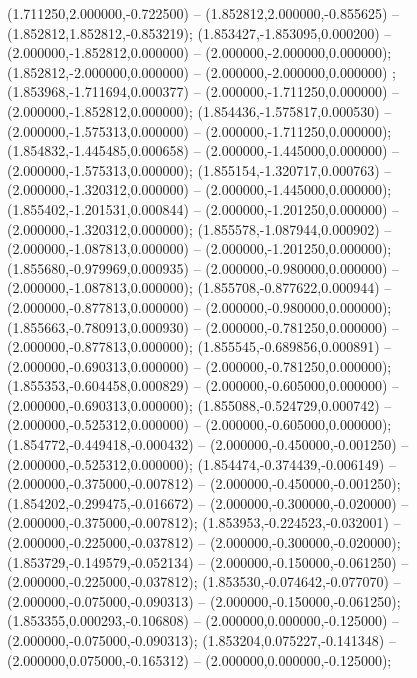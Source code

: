  (1.711250,2.000000,-0.722500) -- (1.852812,2.000000,-0.855625) -- (1.852812,1.852812,-0.853219);
 (1.853427,-1.853095,0.000200) -- (2.000000,-1.852812,0.000000) -- (2.000000,-2.000000,0.000000);
 (1.852812,-2.000000,0.000000) -- (2.000000,-2.000000,0.000000) ;
 (1.853968,-1.711694,0.000377) -- (2.000000,-1.711250,0.000000) -- (2.000000,-1.852812,0.000000);
 (1.854436,-1.575817,0.000530) -- (2.000000,-1.575313,0.000000) -- (2.000000,-1.711250,0.000000);
 (1.854832,-1.445485,0.000658) -- (2.000000,-1.445000,0.000000) -- (2.000000,-1.575313,0.000000);
 (1.855154,-1.320717,0.000763) -- (2.000000,-1.320312,0.000000) -- (2.000000,-1.445000,0.000000);
 (1.855402,-1.201531,0.000844) -- (2.000000,-1.201250,0.000000) -- (2.000000,-1.320312,0.000000);
 (1.855578,-1.087944,0.000902) -- (2.000000,-1.087813,0.000000) -- (2.000000,-1.201250,0.000000);
 (1.855680,-0.979969,0.000935) -- (2.000000,-0.980000,0.000000) -- (2.000000,-1.087813,0.000000);
 (1.855708,-0.877622,0.000944) -- (2.000000,-0.877813,0.000000) -- (2.000000,-0.980000,0.000000);
 (1.855663,-0.780913,0.000930) -- (2.000000,-0.781250,0.000000) -- (2.000000,-0.877813,0.000000);
 (1.855545,-0.689856,0.000891) -- (2.000000,-0.690313,0.000000) -- (2.000000,-0.781250,0.000000);
 (1.855353,-0.604458,0.000829) -- (2.000000,-0.605000,0.000000) -- (2.000000,-0.690313,0.000000);
 (1.855088,-0.524729,0.000742) -- (2.000000,-0.525312,0.000000) -- (2.000000,-0.605000,0.000000);
 (1.854772,-0.449418,-0.000432) -- (2.000000,-0.450000,-0.001250) -- (2.000000,-0.525312,0.000000);
 (1.854474,-0.374439,-0.006149) -- (2.000000,-0.375000,-0.007812) -- (2.000000,-0.450000,-0.001250);
 (1.854202,-0.299475,-0.016672) -- (2.000000,-0.300000,-0.020000) -- (2.000000,-0.375000,-0.007812);
 (1.853953,-0.224523,-0.032001) -- (2.000000,-0.225000,-0.037812) -- (2.000000,-0.300000,-0.020000);
 (1.853729,-0.149579,-0.052134) -- (2.000000,-0.150000,-0.061250) -- (2.000000,-0.225000,-0.037812);
 (1.853530,-0.074642,-0.077070) -- (2.000000,-0.075000,-0.090313) -- (2.000000,-0.150000,-0.061250);
 (1.853355,0.000293,-0.106808) -- (2.000000,0.000000,-0.125000) -- (2.000000,-0.075000,-0.090313);
 (1.853204,0.075227,-0.141348) -- (2.000000,0.075000,-0.165312) -- (2.000000,0.000000,-0.125000);
